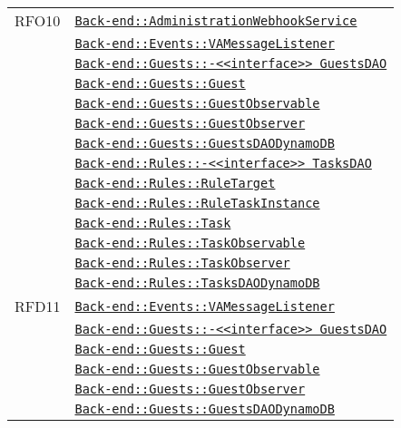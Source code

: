 \begin{longtable}{|>{\centering}m{3cm}|m{10cm}<{\centering}|}
RFO10 & \hyperref[Back-end::AdministrationWebhookService]{\texttt{Back-end::AdministrationWebhookService}}\\
& \hyperref[Back-end::Events::VAMessageListener]{\texttt{Back-end::Events::VAMessageListener}}\\
& \hyperref[Back-end::Guests::<<interface>> GuestsDAO]{\texttt{Back-end::Guests::-\linebreak <<interface>> GuestsDAO}}\\
& \hyperref[Back-end::Guests::Guest]{\texttt{Back-end::Guests::Guest}}\\
& \hyperref[Back-end::Guests::GuestObservable]{\texttt{Back-end::Guests::GuestObservable}}\\
& \hyperref[Back-end::Guests::GuestObserver]{\texttt{Back-end::Guests::GuestObserver}}\\
& \hyperref[Back-end::Guests::GuestsDAODynamoDB]{\texttt{Back-end::Guests::GuestsDAODynamoDB}}\\
& \hyperref[Back-end::Rules::<<interface>> TasksDAO]{\texttt{Back-end::Rules::-\linebreak <<interface>> TasksDAO}}\\
& \hyperref[Back-end::Rules::RuleTarget]{\texttt{Back-end::Rules::RuleTarget}}\\
& \hyperref[Back-end::Rules::RuleTaskInstance]{\texttt{Back-end::Rules::RuleTaskInstance}}\\
& \hyperref[Back-end::Rules::Task]{\texttt{Back-end::Rules::Task}}\\
& \hyperref[Back-end::Rules::TaskObservable]{\texttt{Back-end::Rules::TaskObservable}}\\
& \hyperref[Back-end::Rules::TaskObserver]{\texttt{Back-end::Rules::TaskObserver}}\\
& \hyperref[Back-end::Rules::TasksDAODynamoDB]{\texttt{Back-end::Rules::TasksDAODynamoDB}}\\ \hline

RFD11 & \hyperref[Back-end::Events::VAMessageListener]{\texttt{Back-end::Events::VAMessageListener}}\\
& \hyperref[Back-end::Guests::<<interface>> GuestsDAO]{\texttt{Back-end::Guests::-\linebreak <<interface>> GuestsDAO}}\\
& \hyperref[Back-end::Guests::Guest]{\texttt{Back-end::Guests::Guest}}\\
& \hyperref[Back-end::Guests::GuestObservable]{\texttt{Back-end::Guests::GuestObservable}}\\
& \hyperref[Back-end::Guests::GuestObserver]{\texttt{Back-end::Guests::GuestObserver}}\\
& \hyperref[Back-end::Guests::GuestsDAODynamoDB]{\texttt{Back-end::Guests::GuestsDAODynamoDB}}\\ \hline


\end{longtable}
